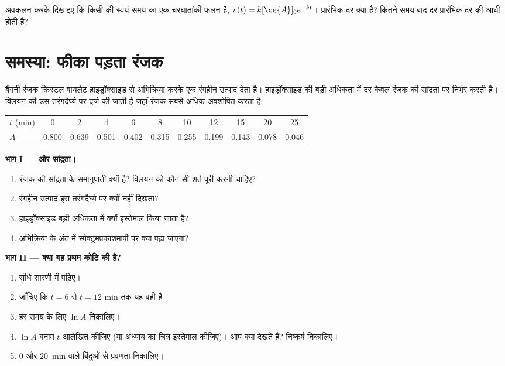 \begin{exercise}[$\star\star\star$]\label{exo:g12:reaction-rates:15}
अवकलन करके दिखाइए कि किसी
 की  स्वयं समय का एक चरघातांकी फलन है,
$v(t) = k[\ce{A}]_0 e^{-kt}$। प्रारंभिक दर क्या है? कितने समय बाद
दर प्रारंभिक दर की आधी होती है?
\end{exercise}

\section{समस्या: फीका पड़ता रंजक}

\begin{problem}
\label{pb:g12:reaction-rates:1}
बैंगनी रंजक क्रिस्टल वायलेट हाइड्रॉक्साइड  से अभिक्रिया करके एक
रंगहीन उत्पाद देता है। हाइड्रॉक्साइड की बड़ी अधिकता में दर केवल
रंजक की सांद्रता पर निर्भर करती है। विलयन की 
उस तरंगदैर्घ्य पर दर्ज की जाती है जहाँ रंजक सबसे अधिक अवशोषित करता है:
\begin{center}
\small
\begin{tabular}{l*{10}{c}}
\hline
$t$ (\si{min}) & 0 & 2 & 4 & 6 & 8 & 10 & 12 & 15 & 20 & 25 \\
$A$ & 0.800 & 0.639 & 0.501 & 0.402 & 0.315 & 0.255 & 0.199 & 0.143 &
0.078 & 0.046 \\
\hline
\end{tabular}
\end{center}

\medskip
\noindent\textbf{भाग I ---  और सांद्रता।}
\begin{enumerate}
  \item {} रंजक की सांद्रता के समानुपाती क्यों है? विलयन को
        कौन-सी शर्त पूरी करनी चाहिए?
  \item रंगहीन उत्पाद इस तरंगदैर्घ्य पर क्यों नहीं दिखता?
  \item हाइड्रॉक्साइड बड़ी अधिकता में क्यों इस्तेमाल किया जाता है?
  \item अभिक्रिया के अंत में स्पेक्ट्रमप्रकाशमापी पर क्या पढ़ा
        जाएगा?
\end{enumerate}

\medskip
\noindent\textbf{भाग II --- क्या यह प्रथम कोटि की है?}
\begin{enumerate}[resume]
  \item {} सीधे सारणी में पढ़िए।
  \item जाँचिए कि $t = 6$ से $t = 12$ min तक यह वही है।
  \item हर समय के लिए $\ln A$ निकालिए।
  \item $\ln A$ बनाम $t$ आलेखित कीजिए (या अध्याय का चित्र इस्तेमाल कीजिए)। आप
        क्या देखते हैं? निष्कर्ष निकालिए।
  \item 0 और \qty{20}{min} वाले बिंदुओं से प्रवणता निकालिए।
\end{enumerate}


\end{problem}
